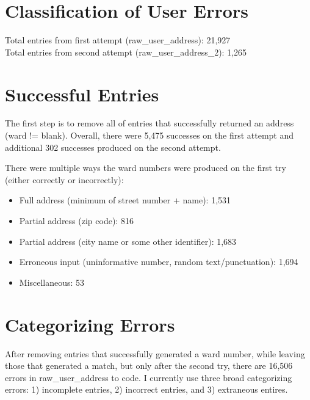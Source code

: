 \documentclass[12pt]{article}
\begin{document}
\section{Classification of User Errors}
Total entries from first attempt (raw\_user\_address): 21,927
\\Total entries from second attempt (raw\_user\_address\_2): 1,265

\section{Successful Entries}
The first step is to remove all of entries that successfully returned an address (ward != blank). Overall, there were  5,475 successes on the first attempt and additional 302 successes produced on the second attempt. 


There were multiple ways the ward numbers were produced on the first try (either correctly or incorrectly):
\begin{itemize}
\item Full address (minimum of street number + name): 1,531
\item Partial address (zip code): 816
\item Partial address (city name or some other identifier): 1,683
\item Erroneous input (uninformative number, random text/punctuation): 1,694
\item Miscellaneous: 53
\end{itemize}


\section{Categorizing Errors}
After removing entries that successfully generated a ward number, while leaving those that generated a match, but only after the second try, there are 16,506 errors in raw\_user\_address to code. I currently use three broad categorizing errors: 1) incomplete entries, 2) incorrect entries, and 3) extraneous entires. 
\end{document}

